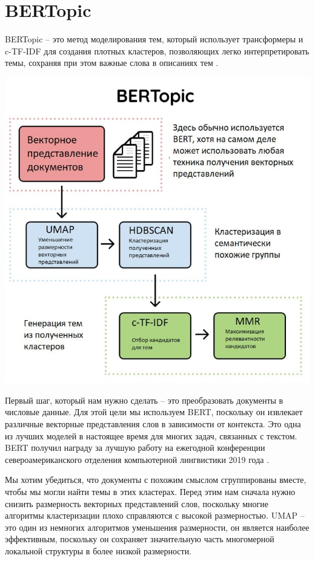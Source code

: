 \section{BERTopic}

BERTopic -- это метод моделирования тем, который использует трансформеры и c-TF-IDF для создания плотных кластеров, позволяющих легко интерпретировать темы, сохраняя при этом важные слова в описаниях тем \cite{bib234234}. 

\includegraphics[scale=0.9]{pics/bertopic.jpg}


Первый шаг, который нам нужно сделать -- это преобразовать документы в числовые данные. Для этой цели мы используем BERT, поскольку он извлекает различные векторные представления слов в зависимости от контекста. Это одна из лучших моделей в настоящее время для многих задач, связанных с текстом. BERT получил награду за лучшую работу на ежегодной конференции североамериканского отделения  компьютерной лингвистики 2019 года \cite{bib_1} \cite{bib_2}.

Мы хотим убедиться, что документы с похожим смыслом сгруппированы вместе, чтобы мы могли найти темы в этих кластерах. Перед этим нам сначала нужно снизить размерность векторных представлений слов, поскольку многие алгоритмы кластеризации плохо справляются с высокой размерностью. 
UMAP -- это один из немногих алгоритмов уменьшения размерности, он является наиболее эффективным,
 поскольку он сохраняет значительную часть многомерной локальной структуры в более низкой размерности. 


